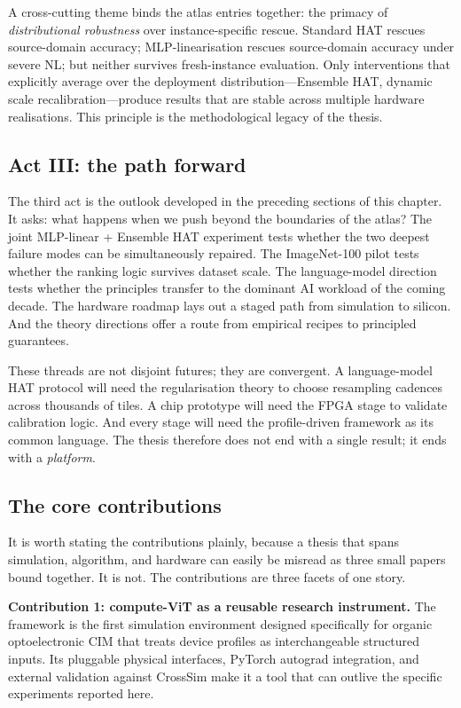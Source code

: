 A cross-cutting theme binds the atlas entries together: the primacy of \emph{distributional robustness} over instance-specific rescue.  Standard HAT rescues source-domain accuracy; MLP-linearisation rescues source-domain accuracy under severe NL; but neither survives fresh-instance evaluation.  Only interventions that explicitly average over the deployment distribution---Ensemble HAT, dynamic scale recalibration---produce results that are stable across multiple hardware realisations.  This principle is the methodological legacy of the thesis.

\subsection{Act III: the path forward}

The third act is the outlook developed in the preceding sections of this chapter.  It asks: what happens when we push beyond the boundaries of the atlas?  The joint MLP-linear + Ensemble HAT experiment tests whether the two deepest failure modes can be simultaneously repaired.  The ImageNet-100 pilot tests whether the ranking logic survives dataset scale.  The language-model direction tests whether the principles transfer to the dominant AI workload of the coming decade.  The hardware roadmap lays out a staged path from simulation to silicon.  And the theory directions offer a route from empirical recipes to principled guarantees.

These threads are not disjoint futures; they are convergent.  A language-model HAT protocol will need the regularisation theory to choose resampling cadences across thousands of tiles.  A chip prototype will need the FPGA stage to validate calibration logic.  And every stage will need the profile-driven framework as its common language.  The thesis therefore does not end with a single result; it ends with a \emph{platform}.

\subsection{The core contributions}
\label{subsec:core-contributions}

It is worth stating the contributions plainly, because a thesis that spans simulation, algorithm, and hardware can easily be misread as three small papers bound together.  It is not.  The contributions are three facets of one story.

\textbf{Contribution 1: compute-ViT as a reusable research instrument.}  The framework is the first simulation environment designed specifically for organic optoelectronic CIM that treats device profiles as interchangeable structured inputs.  Its pluggable physical interfaces, PyTorch autograd integration, and external validation against CrossSim make it a tool that can outlive the specific experiments reported here.

